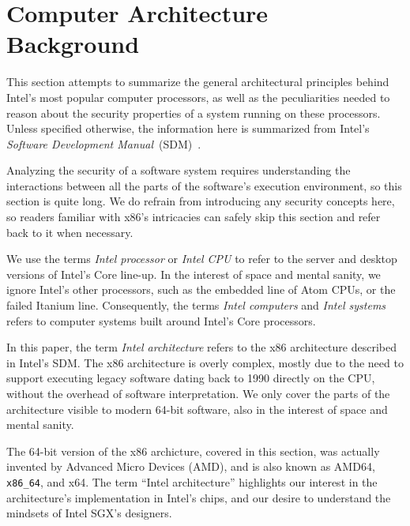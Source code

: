 \section{Computer Architecture Background}
\label{sec:architecture_background}

This section attempts to summarize the general architectural principles behind
Intel's most popular computer processors, as well as the peculiarities needed
to reason about the security properties of a system running on these
processors. Unless specified otherwise, the information here is summarized from
Intel's \textit{Software Development Manual}~(SDM)~\cite{intel2015sdm}.

Analyzing the security of a software system requires understanding the
interactions between all the parts of the software's execution environment, so
this section is quite long. We do refrain from introducing any security
concepts here, so readers familiar with x86's intricacies can safely skip this
section and refer back to it when necessary.

We use the terms \textit{Intel processor} or \textit{Intel CPU} to refer to the
server and desktop versions of Intel's Core line-up. In the interest of space
and mental sanity, we ignore Intel's other processors, such as the embedded
line of Atom CPUs, or the failed Itanium line. Consequently, the terms
\textit{Intel computers} and \textit{Intel systems} refers to computer systems
built around Intel's Core processors.

In this paper, the term \textit{Intel architecture} refers to the x86
architecture described in Intel's SDM. The x86 architecture is overly complex,
mostly due to the need to support executing legacy software dating back to 1990
directly on the CPU, without the overhead of software interpretation. We only
cover the parts of the architecture visible to modern 64-bit software, also
in the interest of space and mental sanity.

The 64-bit version of the x86 archicture, covered in this section, was actually
invented by Advanced Micro Devices (AMD), and is also known as AMD64,
\texttt{x86\_64}, and x64. The term ``Intel architecture'' highlights our
interest in the architecture's implementation in Intel's chips, and our desire
to understand the mindsets of Intel SGX's designers.
















